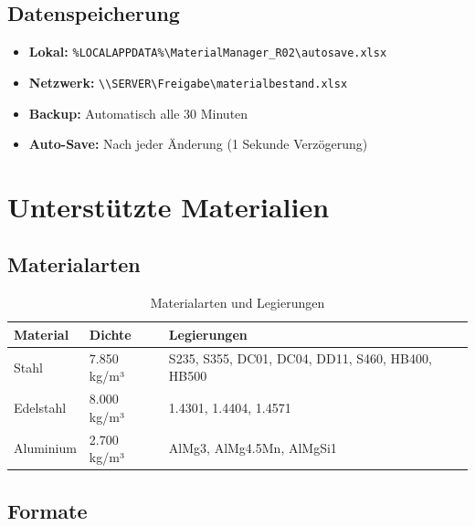\documentclass[a4paper,12pt]{article}
\begin{document}
\subsection{Datenspeicherung}

\begin{infobox}
\begin{itemize}
    \item \textbf{Lokal:} \texttt{\%LOCALAPPDATA\%\textbackslash MaterialManager\_R02\textbackslash autosave.xlsx}
    \item \textbf{Netzwerk:} \texttt{\textbackslash\textbackslash SERVER\textbackslash Freigabe\textbackslash materialbestand.xlsx}
    \item \textbf{Backup:} Automatisch alle 30 Minuten
    \item \textbf{Auto-Save:} Nach jeder Änderung (1 Sekunde Verzögerung)
\end{itemize}
\end{infobox}

\section{Unterstützte Materialien}

\subsection{Materialarten}

\begin{table}[h]
\centering
\begin{tabularx}{\textwidth}{l l X}
\toprule
\textbf{Material} & \textbf{Dichte} & \textbf{Legierungen} \\
\midrule
Stahl & 7.850 kg/m³ & S235, S355, DC01, DC04, DD11, S460, HB400, HB500 \\
Edelstahl & 8.000 kg/m³ & 1.4301, 1.4404, 1.4571 \\
Aluminium & 2.700 kg/m³ & AlMg3, AlMg4.5Mn, AlMgSi1 \\
\bottomrule
\end{tabularx}
\caption{Materialarten und Legierungen}
\end{table}

\subsection{Formate}
\end{document}
